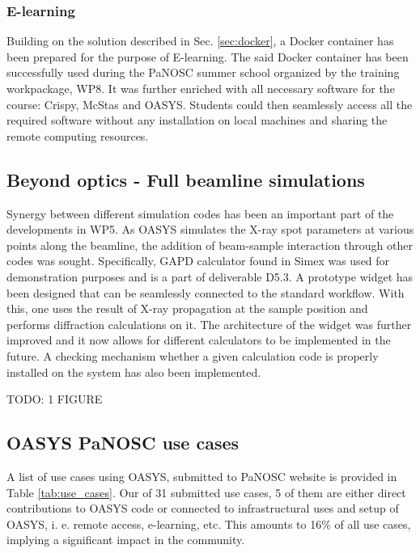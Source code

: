 \documentclass[11pt, a4paper]{article}
\begin{document}
\subsubsection{E-learning}

Building on the solution described in Sec. \ref{sec:docker}, a Docker container has been prepared for the purpose of E-learning. The said Docker container has been successfully used during the PaNOSC summer school organized by the training workpackage, WP8. It was further enriched with all necessary software for the course: Crispy, McStas and OASYS. Students could then seamlessly access all the required software without any installation on local machines and sharing the remote computing resources.

\subsection{Beyond optics - Full beamline simulations}

Synergy between different simulation codes has been an important part of the developments in WP5. As OASYS simulates the X-ray spot parameters at various points along the beamline, the addition of beam-sample interaction through other codes was sought. Specifically, GAPD calculator found in Simex was used for demonstration purposes and is a part of deliverable D5.3. A prototype widget has been designed that can be seamlessly connected to the standard workflow. With this, one uses the result of X-ray propagation at the sample position and performs diffraction calculations on it. The architecture of the widget was further improved and it now allows for different calculators to be implemented in the future. A checking mechanism whether a given calculation code is properly installed on the system has also been implemented.

TODO: 1 FIGURE

\subsection{OASYS PaNOSC use cases}
\label{subsec:panosc_use_cases}
A list of use cases using OASYS, submitted to PaNOSC website is provided in Table \ref{tab:use_cases}. Our of 31 submitted use cases, 5 of them are either direct contributions to OASYS code or connected to infrastructural uses and setup of OASYS, i. e. remote access, e-learning, etc. This amounts to 16\% of all use cases, implying a significant impact in the community.
\end{document}
